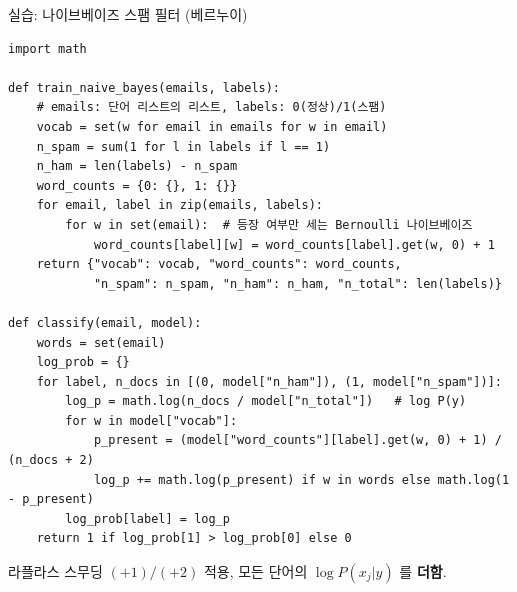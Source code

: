 \begin{frame}[fragile,shrink=19]{실습: 나이브베이즈 스팸 필터 (베르누이)}
  \begin{lstlisting}
import math

def train_naive_bayes(emails, labels):
    # emails: 단어 리스트의 리스트, labels: 0(정상)/1(스팸)
    vocab = set(w for email in emails for w in email)
    n_spam = sum(1 for l in labels if l == 1)
    n_ham = len(labels) - n_spam
    word_counts = {0: {}, 1: {}}
    for email, label in zip(emails, labels):
        for w in set(email):  # 등장 여부만 세는 Bernoulli 나이브베이즈
            word_counts[label][w] = word_counts[label].get(w, 0) + 1
    return {"vocab": vocab, "word_counts": word_counts,
            "n_spam": n_spam, "n_ham": n_ham, "n_total": len(labels)}

def classify(email, model):
    words = set(email)
    log_prob = {}
    for label, n_docs in [(0, model["n_ham"]), (1, model["n_spam"])]:
        log_p = math.log(n_docs / model["n_total"])   # log P(y)
        for w in model["vocab"]:
            p_present = (model["word_counts"][label].get(w, 0) + 1) / (n_docs + 2)
            log_p += math.log(p_present) if w in words else math.log(1 - p_present)
        log_prob[label] = log_p
    return 1 if log_prob[1] > log_prob[0] else 0
  \end{lstlisting}
  {\footnotesize 라플라스 스무딩 $(+1)/(+2)$ 적용, 모든 단어의
  $\log P(x_j|y)$ 를 \textbf{더함}.}
\end{frame}
